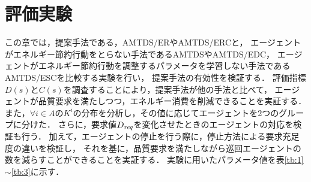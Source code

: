 \documentclass[12pt,a4j,twoside]{jarticle}
\def\AgentSet{A}
\def\Dreq{{D_{\it req}}}
\begin{document}
  
  \section{評価実験}
  この章では，提案手法である，AMTDS/ERやAMTDS/ERCと，
  エージェントがエネルギー節約行動をとらない手法であるAMTDS\cite{Yoneda2013}やAMTDS/EDC\cite{Sugiyama2019}，
  エージェントがエネルギー節約行動を調整するパラメータを学習しない手法であるAMTDS/ESC\cite{Wu2019}を比較する実験を行い，
  提案手法の有効性を検証する．
  評価指標$D(s)$と$C(s)$を調査することにより，提案手法が他の手法と比べて，
  エージェントが品質要求を満たしつつ，エネルギー消費を削減できることを実証する．
  また，$\forall i\in\AgentSet$の$K^i$の分布を分析し，その値に応じてエージェントを2つのグループに分けた．
  さらに，要求値$\Dreq$を変化させたときのエージェントの対応を検証も行う．
  加えて，エージェントの停止を行う際に，停止方法による要求充足度の違いを検証し，
  それを基に，品質要求を満たしながら巡回エージェントの数を減らすことができることを実証する．
  実験に用いたパラメータ値を表\ref{tb:1}$\sim$\ref{tb:3}に示す．
\end{document}
